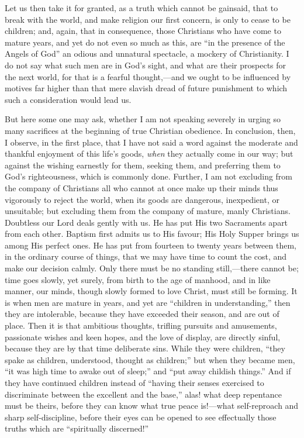 Let us then take it for granted, as a truth which cannot be gainsaid, that to break with the world, and
make religion our first concern, is only to cease to be
children; and, again, that in consequence, those
Christians who have come to mature years, and yet do not
even so much as this, are ``in the presence of the
Angels of God'' an odious and unnatural spectacle, a
mockery of Christianity. I do not say what such men are
in God's sight, and what are their prospects for the next
world, for that is a fearful thought,—and we ought
to be influenced by motives far higher than that mere
slavish dread of future punishment to which such a
consideration would lead us.

But here some one may ask, whether I am not speaking
severely in urging so many sacrifices at the beginning of
true Christian obedience. In conclusion, then, I observe,
in the first place, that I have not said a word against
the moderate and thankful enjoyment of this life's goods,
\emph{when} they actually come in our way; but against
the wishing earnestly for them, seeking them, and
preferring them to God's righteousness, which is commonly
done. Further, I am not excluding from the company of
Christians all who cannot at once make up their minds
thus vigorously to reject the world, when its goods are
dangerous, inexpedient, or unsuitable; but excluding them
from the company of mature, manly Christians. Doubtless
our Lord deals gently with us. He has put His two
Sacraments apart from each other. Baptism first admits us
to His favour; His Holy Supper brings us among His
perfect ones. He has put from fourteen to twenty years
between them, in the ordinary course of things, that we
may have time to count the cost, and make our decision
calmly. Only there must be no standing still,—there
cannot be; time goes slowly, yet surely, from birth to
the age of manhood, and in like manner, our minds, though
slowly formed to love Christ, must still be forming. It
is when men are mature in years, and yet are
``children in understanding,'' then they are
intolerable, because they have exceeded their season, and
are out of place. Then it is that ambitious thoughts,
trifling pursuits and amusements, passionate wishes and
keen hopes, and the love of display, are directly sinful,
because they are by that time deliberate sins. While they
were children, ``they spake as children, understood,
thought as children;'' but when they became men,
``it was high time to awake out of sleep;'' and
``put away childish things.'' And if they have
continued children instead of ``having their senses
exercised to discriminate between the excellent and the
base,'' alas! what deep repentance must be theirs,
before they can know what true peace is!—what
self-reproach and sharp self-discipline, before their
eyes can be opened to see effectually those truths which
are ``spiritually discerned!''

